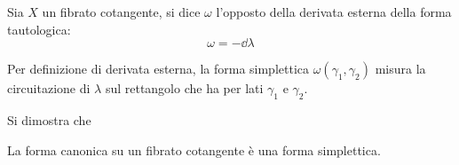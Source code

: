 \begin{definition}
  Sia $X$ un fibrato cotangente, si dice  $\omega$ l'opposto della derivata esterna della forma tautologica: \begin{equation}
  \omega = -\dd{\lambda}
  \end{equation} 
\end{definition}
\begin{remark}
  Per definizione di derivata esterna, la forma simplettica $\omega(\gamma_1,\gamma_2)$ misura la circuitazione di $\lambda$ sul rettangolo che ha per lati $\gamma_1$ e $\gamma_2$. 
\end{remark}
Si dimostra che 
\begin{theorem}
  La forma canonica su un fibrato cotangente è una forma simplettica.
\end{theorem}

